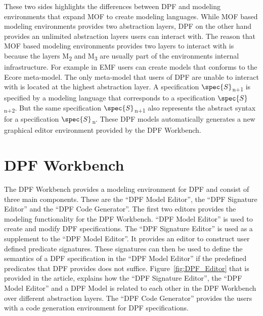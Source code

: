 These two sides highlights the differences between DPF and modeling environments
that expand MOF to create modeling languages. While MOF based modeling
environments provides two abstraction layers, DPF on the other hand provides an
unlimited abstraction layers users can interact with. The reason that MOF based
modeling environments provides two layers to interact with is because the
layers M\textsubscript{2} and M\textsubscript{3} are usually part of the
environments internal infrastructure. For example in EMF users can create
models that conforms to the Ecore meta-model. The only meta-model that users of
DPF are unable to interact with is located at the highest abstraction layer. A
specification $\spec{S}$\textsubscript{n+1} is specified by a modeling language
that corresponds to a specification $\spec{S}$\textsubscript{n+2}. But the same
specification $\spec{S}$\textsubscript{n+1} also represents the abstract syntax
for a specification $\spec{S}$\textsubscript{n}. These DPF models automatically
generates a new graphical editor environment provided by the DPF Workbench.

\section{DPF Workbench}

The DPF Workbench provides a modeling environment for DPF and consist of three
main components. These are the ``DPF Model Editor'', the ``DPF Signature Editor''
and the ``DPF Code Generator''. The first two editors provides the modeling
functionality for the DPF Workbench. ``DPF Model Editor'' is used to create and
modify DPF specifications. The ``DPF Signature Editor'' is used as a supplement
to the ``DPF Model Editor''. It provides an editor to construct user defined
predicate signatures. These signatures can then be used to define the semantics
of a DPF specification in the ``DPF Model Editor'' if the predefined predicates
that DPF provides does not suffice. Figure~\ref{fig:DPF_Editor} that is
provided in the article\cite{Lamo2013}, explains how the ``DPF Signature Editor'',
the ``DPF Model Editor'' and a DPF Model is related to each other in the DPF
Workbench over different abstraction layers. The ``DPF Code Generator'' provides
the users with a code generation environment for DPF specifications.  

